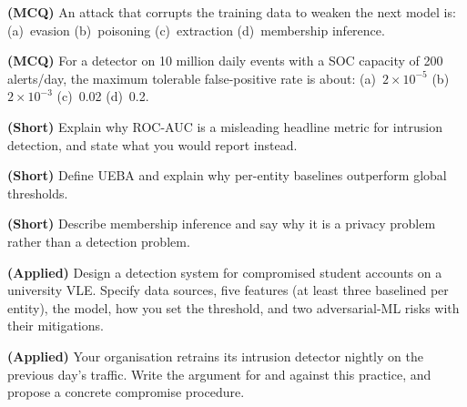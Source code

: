 \begin{reviewq}
  \item \textbf{(MCQ)} An attack that corrupts the training data to weaken the next
        model is: (a)~evasion (b)~poisoning (c)~extraction (d)~membership inference.
  \item \textbf{(MCQ)} For a detector on 10 million daily events with a SOC capacity
        of 200 alerts/day, the maximum tolerable false-positive rate is about:
        (a)~$2\times10^{-5}$ (b)~$2\times10^{-3}$ (c)~0.02 (d)~0.2.
  \item \textbf{(Short)} Explain why ROC-AUC is a misleading headline metric for
        intrusion detection, and state what you would report instead.
  \item \textbf{(Short)} Define UEBA and explain why per-entity baselines outperform
        global thresholds.
  \item \textbf{(Short)} Describe membership inference and say why it is a privacy
        problem rather than a detection problem.
  \item \textbf{(Applied)} Design a detection system for compromised student
        accounts on a university VLE. Specify data sources, five features (at least
        three baselined per entity), the model, how you set the threshold, and two
        adversarial-ML risks with their mitigations.
  \item \textbf{(Applied)} Your organisation retrains its intrusion detector nightly
        on the previous day's traffic. Write the argument for and against this
        practice, and propose a concrete compromise procedure.
\end{reviewq}
